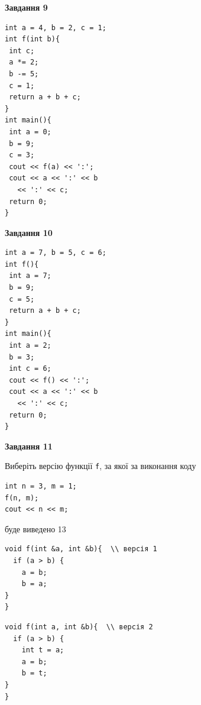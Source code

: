 \documentclass[12pt, ukrainian]{article}
\def\code#1{\Verb!#1!}
\begin{document}
{\begin {large}
\begin{minipage}[t]{11.0cm}
\end{minipage}


\begin{minipage}[t]{7.0cm}

\begin{center}
\textbf{Завдання 9}
\end{center}
\vspace{-8mm}

\begin{verbatim}
int a = 4, b = 2, c = 1;
int f(int b){
 int c;
 a *= 2;
 b -= 5;
 c = 1;
 return a + b + c;
}
int main(){
 int a = 0;
 b = 9;
 c = 3;
 cout << f(a) << ':';
 cout << a << ':' << b 
   << ':' << c;
 return 0;
}
\end{verbatim}



\begin{center}
\textbf{Завдання 10}
\end{center}
\vspace{-8mm}

\begin{verbatim}
int a = 7, b = 5, c = 6;
int f(){
 int a = 7;
 b = 9;
 c = 5;
 return a + b + c;
}
int main(){
 int a = 2;
 b = 3;
 int c = 6;
 cout << f() << ':';
 cout << a << ':' << b 
   << ':' << c;
 return 0;
}
\end{verbatim}

\end{minipage}
\vline \hspace{1mm}
\begin{minipage}[t]{11.0cm}

\begin{center}
\textbf{Завдання 11}
\end{center}
Виберіть версію функції \code{f}, за якої за виконання коду
\begin{verbatim}
int n = 3, m = 1;
f(n, m);
cout << n << m;
\end{verbatim}

буде виведено 13

\begin{verbatim}
void f(int &a, int &b){  \\ версія 1
  if (a > b) {
    a = b;
    b = a;
}  
}
\end{verbatim}

\vspace{-8mm}\begin{verbatim}
void f(int a, int &b){  \\ версія 2
  if (a > b) {
    int t = a;
    a = b;
    b = t;
}  
}
\end{verbatim}


\end{minipage}
\end{large}}
\end{document}
